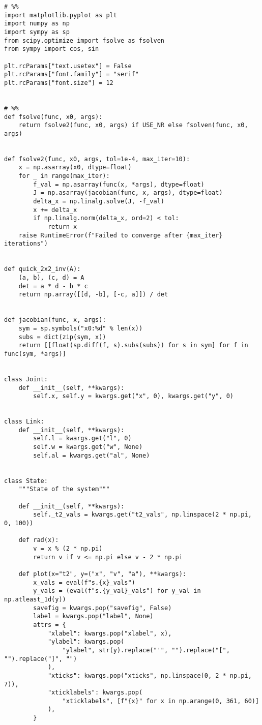 \documentclass[12pt]{article}
\begin{document}
\begin{lstlisting}
# %%
import matplotlib.pyplot as plt
import numpy as np
import sympy as sp
from scipy.optimize import fsolve as fsolven
from sympy import cos, sin

plt.rcParams["text.usetex"] = False
plt.rcParams["font.family"] = "serif"
plt.rcParams["font.size"] = 12


# %%
def fsolve(func, x0, args):
    return fsolve2(func, x0, args) if USE_NR else fsolven(func, x0, args)


def fsolve2(func, x0, args, tol=1e-4, max_iter=10):
    x = np.asarray(x0, dtype=float)
    for _ in range(max_iter):
        f_val = np.asarray(func(x, *args), dtype=float)
        J = np.asarray(jacobian(func, x, args), dtype=float)
        delta_x = np.linalg.solve(J, -f_val)
        x += delta_x
        if np.linalg.norm(delta_x, ord=2) < tol:
            return x
    raise RuntimeError(f"Failed to converge after {max_iter} iterations")


def quick_2x2_inv(A):
    (a, b), (c, d) = A
    det = a * d - b * c
    return np.array([[d, -b], [-c, a]]) / det


def jacobian(func, x, args):
    sym = sp.symbols("x0:%d" % len(x))
    subs = dict(zip(sym, x))
    return [[float(sp.diff(f, s).subs(subs)) for s in sym] for f in func(sym, *args)]


class Joint:
    def __init__(self, **kwargs):
        self.x, self.y = kwargs.get("x", 0), kwargs.get("y", 0)


class Link:
    def __init__(self, **kwargs):
        self.l = kwargs.get("l", 0)
        self.w = kwargs.get("w", None)
        self.al = kwargs.get("al", None)


class State:
    """State of the system"""

    def __init__(self, **kwargs):
        self._t2_vals = kwargs.get("t2_vals", np.linspace(2 * np.pi, 0, 100))

    def rad(x):
        v = x % (2 * np.pi)
        return v if v <= np.pi else v - 2 * np.pi

    def plot(x="t2", y=("x", "v", "a"), **kwargs):
        x_vals = eval(f"s.{x}_vals")
        y_vals = (eval(f"s.{y_val}_vals") for y_val in np.atleast_1d(y))
        savefig = kwargs.pop("savefig", False)
        label = kwargs.pop("label", None)
        attrs = {
            "xlabel": kwargs.pop("xlabel", x),
            "ylabel": kwargs.pop(
                "ylabel", str(y).replace("'", "").replace("[", "").replace("]", "")
            ),
            "xticks": kwargs.pop("xticks", np.linspace(0, 2 * np.pi, 7)),
            "xticklabels": kwargs.pop(
                "xticklabels", [f"{x}" for x in np.arange(0, 361, 60)]
            ),
        }


\end{lstlisting}
\end{document}
